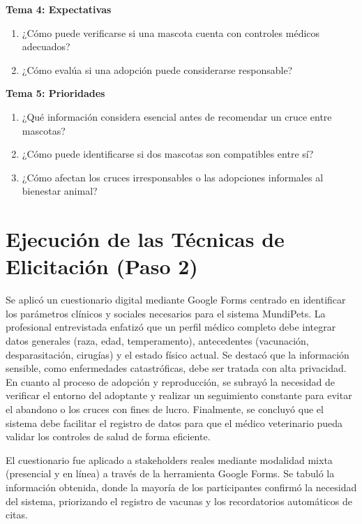 \documentclass[journal,onecolumn]{IEEEtran}
\begin{document}
\noindent\textbf{Tema 4: Expectativas}
\begin{enumerate}[label=\textbf{P\arabic*.}, leftmargin=*, resume]
	\item ¿Cómo puede verificarse si una mascota cuenta con controles médicos adecuados?
	\item ¿Cómo evalúa si una adopción puede considerarse responsable?
\end{enumerate}

\noindent\textbf{Tema 5: Prioridades}
\begin{enumerate}[label=\textbf{P\arabic*.}, leftmargin=*, resume]
	\item ¿Qué información considera esencial antes de recomendar un cruce entre mascotas?
	\item ¿Cómo puede identificarse si dos mascotas son compatibles entre sí?
	\item ¿Cómo afectan los cruces irresponsables o las adopciones informales al bienestar animal?
\end{enumerate}

\newpage

\section{Ejecución de las Técnicas de Elicitación (Paso 2)}

Se aplicó un cuestionario digital mediante Google Forms centrado en identificar los parámetros
clínicos y sociales necesarios para el sistema MundiPets. La profesional
entrevistada enfatizó que un perfil médico completo debe integrar datos
generales (raza, edad, temperamento), antecedentes (vacunación,
desparasitación, cirugías) y el estado físico actual. Se destacó que la
información sensible, como enfermedades catastróficas, debe ser tratada con
alta privacidad. En cuanto al proceso de adopción y reproducción, se
subrayó la necesidad de verificar el entorno del adoptante y realizar un
seguimiento constante para evitar el abandono o los cruces con fines de
lucro. Finalmente, se concluyó que el sistema debe facilitar el registro de
datos para que el médico veterinario pueda validar los controles de salud
de forma eficiente.

El cuestionario fue aplicado a stakeholders reales mediante modalidad mixta
(presencial y en línea) a través de la herramienta Google Forms. Se tabuló 
la información obtenida, donde la mayoría de los participantes confirmó la 
necesidad del sistema, priorizando el registro de vacunas y los recordatorios 
automáticos de citas.
\end{document}
